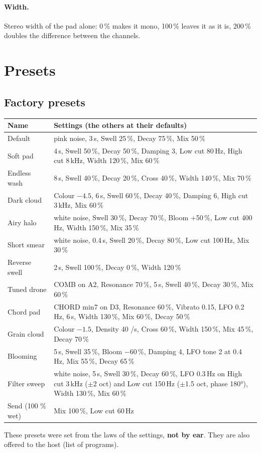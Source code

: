 \documentclass[a4paper,11pt]{article}
\begin{document}
\paragraph{Width.} Stereo width of the pad alone: 0\,\% makes it mono, 100\,\% leaves it as it is,
200\,\% doubles the difference between the channels.

\section{Presets}\label{sec:presets}

\subsection{Factory presets}
\begin{center}
\small
\begin{tabularx}{\textwidth}{@{}l X@{}}
\toprule
Name & Settings (the others at their defaults) \\
\midrule
Default & pink noise, 3\,s, Swell 25\,\%, Decay 75\,\%, Mix 50\,\% \\
Soft pad & 4\,s, Swell 50\,\%, Decay 50\,\%, Damping 3, Low cut 80\,Hz, High cut 8\,kHz, Width 120\,\%, Mix 60\,\% \\
Endless wash & 8\,s, Swell 40\,\%, Decay 20\,\%, Cross 40\,\%, Width 140\,\%, Mix 70\,\% \\
Dark cloud & Colour $-4.5$, 6\,s, Swell 60\,\%, Decay 40\,\%, Damping 6, High cut 3\,kHz, Mix 60\,\% \\
Airy halo & white noise, Swell 30\,\%, Decay 70\,\%, Bloom +50\,\%, Low cut 400\,Hz, Width 150\,\%, Mix 35\,\% \\
Short smear & white noise, 0.4\,s, Swell 20\,\%, Decay 80\,\%, Low cut 100\,Hz, Mix 30\,\% \\
Reverse swell & 2\,s, Swell 100\,\%, Decay 0\,\%, Width 120\,\% \\
Tuned drone & COMB on A2, Resonance 70\,\%, 5\,s, Swell 40\,\%, Decay 30\,\%, Mix 60\,\% \\
Chord pad & CHORD min7 on D3, Resonance 60\,\%, Vibrato 0.15, LFO 0.2\,Hz, 6\,s, Width 130\,\%, Mix 60\,\%, Decay 50\,\% \\
Grain cloud & Colour $-1.5$, Density 40 /s, Cross 60\,\%, Width 150\,\%, Mix 45\,\%, Decay 70\,\% \\
Blooming & 5\,s, Swell 35\,\%, Bloom $-60$\,\%, Damping 4, LFO tone 2 at 0.4\,Hz, Mix 55\,\%, Decay 65\,\% \\
Filter sweep & white noise, 5\,s, Swell 30\,\%, Decay 60\,\%, LFO 0.3\,Hz on High cut 3\,kHz ($\pm$2 oct) and Low cut 150\,Hz ($\pm$1.5 oct, phase 180°), Width 130\,\%, Mix 60\,\% \\
Send (100 \% wet) & Mix 100\,\%, Low cut 60\,Hz \\
\bottomrule
\end{tabularx}
\end{center}
These presets were set from the laws of the settings, \textbf{not by ear}. They are also offered to
the host (list of programs).
\end{document}
